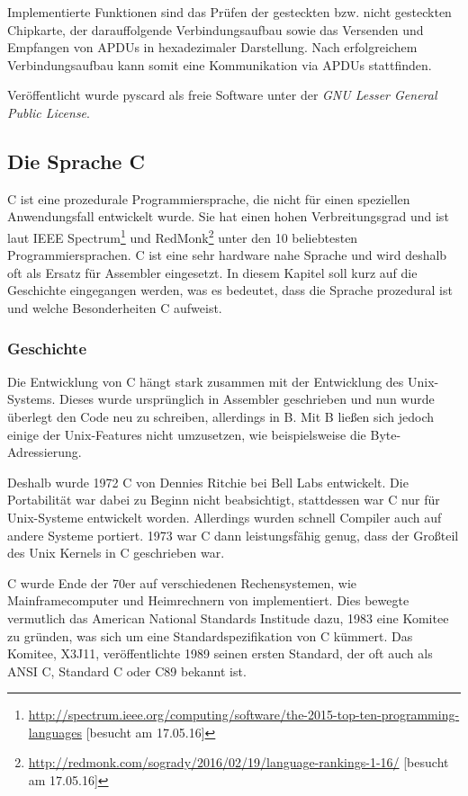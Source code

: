 Implementierte Funktionen sind das Prüfen der gesteckten bzw. nicht gesteckten
Chipkarte, der darauffolgende Verbindungsaufbau sowie das Versenden und
Empfangen von APDUs in hexadezimaler Darstellung.
Nach erfolgreichem Verbindungsaufbau kann somit eine Kommunikation via
APDUs stattfinden.

Veröffentlicht wurde pyscard als freie Software unter der
\textit{GNU Lesser General Public License}.

\subsection{Die Sprache C}
 C ist eine prozedurale Programmiersprache, die nicht für einen speziellen
 Anwendungsfall entwickelt wurde. Sie hat einen hohen Verbreitungsgrad
 und ist laut \ac{IEEE} Spectrum\footnote{\url{http://spectrum.ieee.org/computing/software/the-2015-top-ten-programming-languages} [besucht am 17.05.16]}
 und RedMonk\footnote{\url{http://redmonk.com/sogrady/2016/02/19/language-rankings-1-16/} [besucht am 17.05.16]}
 unter den 10 beliebtesten Programmier\-sprachen. C ist eine sehr hardware\-
 nahe Sprache und wird deshalb oft als Ersatz für Assembler eingesetzt. In
 diesem Kapitel soll kurz auf die Geschichte eingegangen werden, was es
 bedeutet, dass die Sprache prozedural ist und welche Besonderheiten C
 aufweist.

 \subsubsection{Geschichte}
  Die Entwicklung von C hängt stark zusammen mit der Entwicklung des Unix-Systems.
  Dieses wurde ursprünglich in Assembler geschrieben und nun wurde
  überlegt den Code neu zu schreiben, allerdings in B. Mit B ließen sich jedoch
  einige der Unix-Features nicht umzusetzen, wie beispielsweise die Byte-Adressierung.
  
  Deshalb wurde 1972 C von Dennies Ritchie bei Bell Labs entwickelt. Die Portabilität war
  dabei zu Beginn nicht beabsichtigt, stattdessen war C nur für Unix-Systeme entwickelt
  worden. Allerdings wurden schnell Compiler auch auf andere Systeme portiert. 1973
  war C dann leistungsfähig genug, dass der Großteil des Unix Kernels in C geschrieben war.
  
  C wurde Ende der 70er auf verschiedenen Rechensystemen, wie Mainframecomputer und
  Heimrechnern von implementiert. Dies bewegte vermutlich das American National Standards
  Institude dazu, 1983 eine Komitee zu gründen, was sich um eine Standardspezifikation von
  C kümmert. Das Komitee, X3J11, veröffentlichte 1989 seinen ersten Standard, der oft auch
  als ANSI C, Standard C oder C89 bekannt ist.
  
